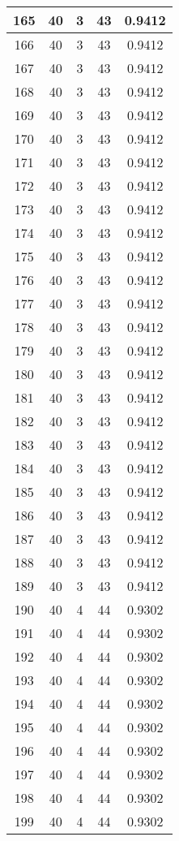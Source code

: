 \documentclass[letterpaper, 12pt]{article}
\begin{document}
\begin{longtable}{|c|c|c|c|c|}
\hline
165 & 40 & 3 & 43 & 0.9412 \\
\hline
166 & 40 & 3 & 43 & 0.9412 \\
\hline
167 & 40 & 3 & 43 & 0.9412 \\
\hline
168 & 40 & 3 & 43 & 0.9412 \\
\hline
169 & 40 & 3 & 43 & 0.9412 \\
\hline
170 & 40 & 3 & 43 & 0.9412 \\
\hline
171 & 40 & 3 & 43 & 0.9412 \\
\hline
172 & 40 & 3 & 43 & 0.9412 \\
\hline
173 & 40 & 3 & 43 & 0.9412 \\
\hline
174 & 40 & 3 & 43 & 0.9412 \\
\hline
175 & 40 & 3 & 43 & 0.9412 \\
\hline
176 & 40 & 3 & 43 & 0.9412 \\
\hline
177 & 40 & 3 & 43 & 0.9412 \\
\hline
178 & 40 & 3 & 43 & 0.9412 \\
\hline
179 & 40 & 3 & 43 & 0.9412 \\
\hline
180 & 40 & 3 & 43 & 0.9412 \\
\hline
181 & 40 & 3 & 43 & 0.9412 \\
\hline
182 & 40 & 3 & 43 & 0.9412 \\
\hline
183 & 40 & 3 & 43 & 0.9412 \\
\hline
184 & 40 & 3 & 43 & 0.9412 \\
\hline
185 & 40 & 3 & 43 & 0.9412 \\
\hline
186 & 40 & 3 & 43 & 0.9412 \\
\hline
187 & 40 & 3 & 43 & 0.9412 \\
\hline
188 & 40 & 3 & 43 & 0.9412 \\
\hline
189 & 40 & 3 & 43 & 0.9412 \\
\hline
190 & 40 & 4 & 44 & 0.9302 \\
\hline
191 & 40 & 4 & 44 & 0.9302 \\
\hline
192 & 40 & 4 & 44 & 0.9302 \\
\hline
193 & 40 & 4 & 44 & 0.9302 \\
\hline
194 & 40 & 4 & 44 & 0.9302 \\
\hline
195 & 40 & 4 & 44 & 0.9302 \\
\hline
196 & 40 & 4 & 44 & 0.9302 \\
\hline
197 & 40 & 4 & 44 & 0.9302 \\
\hline
198 & 40 & 4 & 44 & 0.9302 \\
\hline
199 & 40 & 4 & 44 & 0.9302 \\
\hline
\end{longtable}
\end{document}
